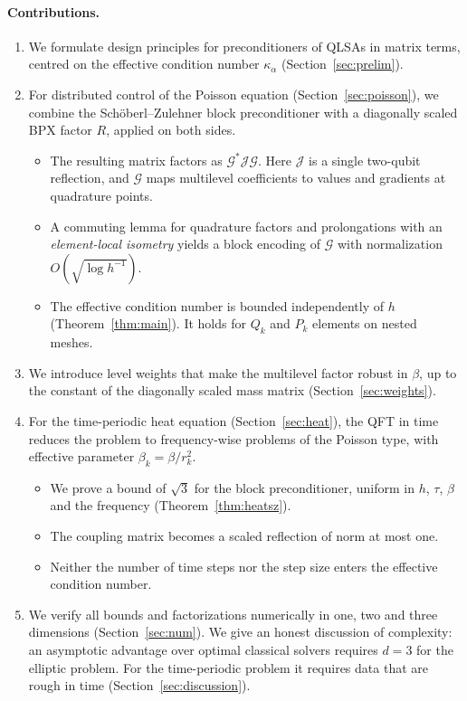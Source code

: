 \documentclass[11pt,a4paper]{article}
\newcommand{\G}{\mathcal{G}}
\newcommand{\J}{\mathcal{J}}
\theoremstyle{remark}
\begin{document}
\paragraph{Contributions.}
\begin{enumerate}
\item We formulate design principles for preconditioners of QLSAs in matrix
  terms, centred on the effective condition number $\kappa_\alpha$
  (Section~\ref{sec:prelim}).
\item For distributed control of the Poisson equation
  (Section~\ref{sec:poisson}), we combine the Sch\"oberl--Zulehner block
  preconditioner with a diagonally scaled BPX factor $R$, applied on both
  sides.
  \begin{itemize}
  \item The resulting matrix factors as $\G^*\J\G$. Here $\J$ is a single
    two-qubit reflection, and $\G$ maps multilevel coefficients to values
    and gradients at quadrature points.
  \item A commuting lemma for quadrature factors and prolongations with an
    \emph{element-local isometry} yields a block encoding of $\G$ with
    normalization $O(\sqrt{\log h^{-1}})$.
  \item The effective condition number is bounded independently of $h$
    (Theorem~\ref{thm:main}). It holds for $Q_k$ and $P_k$ elements on
    nested meshes.
  \end{itemize}
\item We introduce level weights that make the multilevel factor robust in
  $\beta$, up to the constant of the diagonally scaled mass matrix
  (Section~\ref{sec:weights}).
\item For the time-periodic heat equation (Section~\ref{sec:heat}), the QFT
  in time reduces the problem to frequency-wise problems of the Poisson
  type, with effective parameter $\beta_k=\beta/r_k^2$.
  \begin{itemize}
  \item We prove a bound of $\sqrt3$ for the block preconditioner, uniform
    in $h$, $\tau$, $\beta$ and the frequency (Theorem~\ref{thm:heatsz}).
  \item The coupling matrix becomes a scaled reflection of norm at most
    one.
  \item Neither the number of time steps nor the step size enters the
    effective condition number.
  \end{itemize}
\item We verify all bounds and factorizations numerically in one, two and
  three dimensions (Section~\ref{sec:num}). We give an honest discussion of
  complexity: an asymptotic advantage over optimal classical solvers
  requires $d=3$ for the elliptic problem. For the time-periodic problem it
  requires data that are rough in time (Section~\ref{sec:discussion}).
\end{enumerate}
\end{document}
